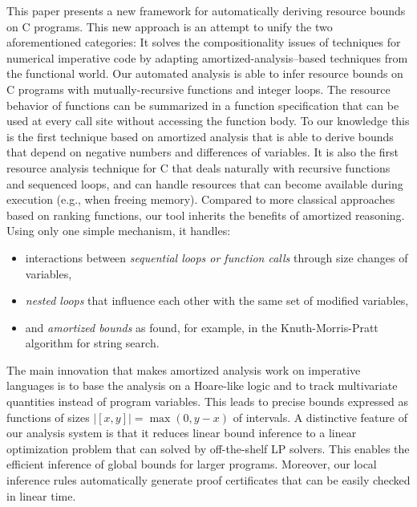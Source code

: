 \documentclass[nocopyrightspace,preprint,pldi]{sigplanconf-pldi15}
\newcommand{\ifshort}[2]{\ifx\fullversion\undefined{#1}\else{#2}\fi}
\newcommand{\itemskip}[0]{\ifshort{\vspace{-3pt}}{}}
\newcommand{\itemskipIn}[0]{\ifshort{\vspace{-1pt}}{}}
\begin{document}
This paper presents a new framework for automatically
deriving resource bounds on C programs.  This new
approach is an attempt to unify the two aforementioned
categories: It solves the compositionality issues of techniques
for numerical imperative code by adapting amortized-analysis--based
techniques from the functional world.
%
Our automated analysis is able to infer
resource bounds on C programs with mutually-recursive functions and integer loops.
%
The resource behavior of functions can be summarized
in a function specification that can be used at every
call site without accessing the function body.
%
To our knowledge this is the first technique based on
amortized analysis that is able to derive bounds that depend on negative numbers
and differences of variables.  It is also the first
resource analysis technique for C that deals naturally with
recursive functions and sequenced loops, and can handle resources that can
become available during execution (e.g., when freeing
memory).  Compared to more classical
approaches based on ranking functions, our tool inherits
the benefits of amortized reasoning.  Using only one
simple mechanism, it handles:
\itemskip
\begin{itemize}
\item interactions between \emph{sequential loops or
  function calls} through size changes of variables,
\itemskipIn
\item \emph{nested loops} that influence each other
  with the same set of modified variables,
\itemskipIn
\item and \emph{amortized bounds} as found, for example, in
  the Knuth-Morris-Pratt algorithm for string search.
\end{itemize}
\itemskip
The main innovation that makes amortized analysis work
on imperative languages is to base the analysis on a
Hoare-like logic and to track multivariate quantities instead
of program variables.  This leads to precise bounds
expressed as functions of sizes $|[x, y]| = \max(0, y-x)$ of
intervals.
%
A distinctive feature of our analysis system is that
it reduces linear bound inference  to a linear optimization problem
that can solved by off-the-shelf LP solvers.  This enables the
efficient inference of global bounds for larger programs.
%
Moreover, our local inference rules automatically generate
proof certificates that can be easily checked in linear time.
\end{document}
